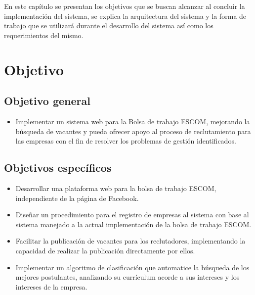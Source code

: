 
En este capítulo se presentan los objetivos que se buscan alcanzar al concluir la implementación del sistema, se 
explica la arquitectura del sistema y la forma de trabajo que se utilizará durante el desarrollo del sistema así como 
los requerimientos del mismo.

\section{Objetivo}
\subsection{Objetivo general}
\begin{itemize}
    \item Implementar un sistema web para la Bolsa de trabajo ESCOM, mejorando la búsqueda de vacantes y pueda 
    ofrecer apoyo al proceso de reclutamiento para las empresas con el fin de resolver los problemas de gestión 
    identificados.
\end{itemize}

\subsection{Objetivos específicos}
        \begin{itemize}
            \item Desarrollar una plataforma web para la bolsa de trabajo ESCOM, independiente de la página de Facebook.
            \item Diseñar un procedimiento para el registro de empresas al sistema con base al sistema manejado a la actual 
            implementación de la bolsa de trabajo ESCOM.
            \item Facilitar la publicación de vacantes para los reclutadores, implementando la capacidad de realizar la
            publicación directamente por ellos.
            \item Implementar un algoritmo de clasificación que automatice la búsqueda de los mejores postulantes, analizando su 
            currículum acorde a sus intereses y los intereses de la empresa.
        \end{itemize}




